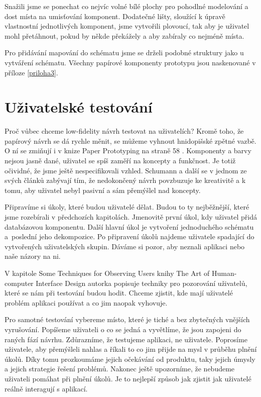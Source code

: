 Snažili jsme se ponechat co nejvíc volné bílé plochy pro pohodlné modelování a dost místa na umisťování komponent. Dodatečné lišty, sloužící k úpravě vlastnostní jednotlivých komponent, jsme vytvořili plovoucí, tak aby je uživatel mohl přetáhnout, pokud by někde překážely a aby zabíraly co nejméně místa.

Pro přidávání mapování do schématu jsme se drželi podobné struktury jako u vytváření schématu. Všechny papírové komponenty prototypu jsou naskenované v příloze \ref{priloha3}.

\section{Uživatelské testování}

Proč vůbec chceme low-fidelity návrh testovat na uživatelích? Kromě toho, že papírový návrh se dá rychle měnit, se můžeme vyhnout hnidopišské zpětné vazbě. O ní se zmiňují i v knize Paper Prototyping na straně 58 \cite{Paper_Prototyping}. Komponenty a barvy nejsou jasně dané, uživatel se spíš zaměří na koncepty a funkčnost. Je totiž očividné, že jsme ještě nespecifikovali vzhled. Schumann a další se v jednom ze svých článků \cite{Schumann_1996_AEN} zabývají tím, že nedokončený návrh povzbuzuje ke kreativitě a k tomu, aby uživatel nebyl pasivní a sám přemýšlel nad koncepty. 

Připravíme si úkoly, které budou uživatelé dělat. Budou to ty nejběžnější, které jsme rozebírali v předchozích kapitolách. Jmenovitě první úkol, kdy uživatel přidá databázovou komponentu. Další hlavní úkol je vytvoření jednoduchého schématu a~poslední jeho dekompozice.
Po připravení úkolů najdeme uživatele spadající do vytvořených uživatelských skupin. Dáváme si pozor, aby neznali aplikaci nebo naše názory na ni.

V kapitole Some Techniques for Observing Users knihy The Art of Human-computer Interface Design \cite{Brenda_1990_art} autorka popisuje techniky pro pozorování uživatelů, které se nám při testování budou hodit. Chceme zjistit, kde mají uživatelé problém aplikaci používat a co jim naopak vyhovuje.

Pro samotné testování vybereme místo, které je tiché a bez zbytečných vnějších vyrušování. Popíšeme uživateli o co se jedná a vyvětlíme, že jsou zapojeni do raných fází návrhu. Zdůrazníme, že testujeme aplikaci, ne uživatele. Poprosíme uživatele, aby přemýšleli nahlas a říkali to co jim přijde na mysl v průběhu plnění úkolů. Díky tomu prozkoumáme jejich očekávání od produktu, taky jejich úmysly a jejich strategie řešení problémů. Nakonec ještě upozorníme, že nebudeme uživateli pomáhat při plnění úkolů. Je to nejlepší způsob jak zjistit jak uživatelé reálně interagují s aplikací.

